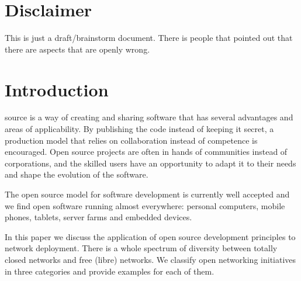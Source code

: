 \documentclass[journal]{IEEEtran}
\begin{document}
%
\IEEEpeerreviewmaketitle

\section{Disclaimer}

This is just a draft/brainstorm document.
There is people that pointed out that there are aspects that are openly wrong.

\section{Introduction}
% 
% 
% 
% 
 source is a way of creating and sharing software that has several advantages and areas of applicability.
By publishing the code instead of keeping it secret, a production model that relies on collaboration instead of competence is encouraged.
Open source projects are often in hands of communities instead of corporations, and the skilled users have an opportunity to adapt it to their needs and shape the evolution of the software.

The open source model for software development is currently well accepted and we find open software running almost everywhere: personal computers, mobile phones, tablets, server farms and embedded devices.

In this paper we discuss the application of open source development principles to network deployment.
There is a whole spectrum of diversity between totally closed networks and free (libre) networks.
We classify open networking initiatives in three categories and provide examples for each of them.
\end{document}

